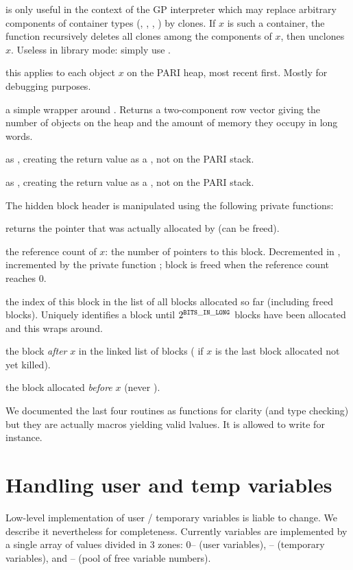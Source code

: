  is only useful in the context of the GP
interpreter which may replace arbitrary components of container types
(, , , ) by clones. If $x$ is such
a container, the function recursively deletes all clones among the components
of $x$, then unclones $x$. Useless in library mode: simply use
.

 this applies
 to each object $x$ on the PARI heap, most recent
first. Mostly for debugging purposes.

 a simple wrapper around . Returns  a
two-component row vector giving the number of objects on the heap and the
amount of memory they occupy in long words.

 as , creating the return
value as a , not on the PARI stack.

 as , creating the return
value as a , not on the PARI stack.

 The hidden block header is manipulated using the
following private functions:

 returns the pointer that was actually allocated
by  (can be freed).

 the reference count of $x$: the number of pointers
to this block. Decremented in , incremented by the private
function ; block is freed when the reference
count reaches $0$.

 the index of this block in the list of all blocks
allocated so far (including freed blocks). Uniquely identifies a block until
$2^{\tt BITS\_IN\_LONG}$ blocks have been allocated and this wraps around.

 the block \emph{after} $x$ in the linked list of
blocks ( if $x$ is the last block allocated not yet killed).

 the block allocated \emph{before} $x$ (never
).

We documented the last four routines as functions for clarity (and type
checking) but they are actually macros yielding valid lvalues. It is allowed
to write  for instance.

\section{Handling user and temp variables}
Low-level implementation of user / temporary variables is liable to change. We
describe it nevertheless for completeness. Currently variables are
implemented by a single array of values divided in 3 zones: 0--
(user variables), -- (temporary variables),
and -- (pool of free variable numbers).

